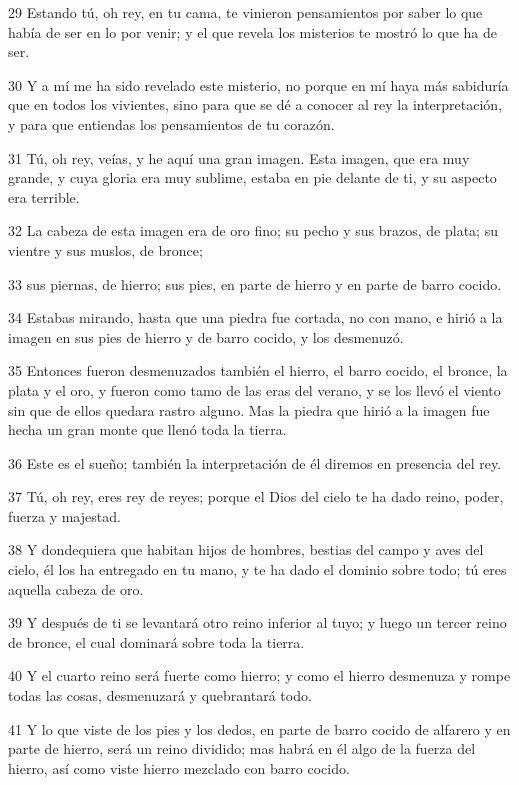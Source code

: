 \par 29 Estando tú, oh rey, en tu cama, te vinieron pensamientos por saber lo que había de ser en lo por venir; y el que revela los misterios te mostró lo que ha de ser.
\par 30 Y a mí me ha sido revelado este misterio, no porque en mí haya más sabiduría que en todos los vivientes, sino para que se dé a conocer al rey la interpretación, y para que entiendas los pensamientos de tu corazón.
\par 31 Tú, oh rey, veías, y he aquí una gran imagen. Esta imagen, que era muy grande, y cuya gloria era muy sublime, estaba en pie delante de ti, y su aspecto era terrible.
\par 32 La cabeza de esta imagen era de oro fino; su pecho y sus brazos, de plata; su vientre y sus muslos, de bronce;
\par 33 sus piernas, de hierro; sus pies, en parte de hierro y en parte de barro cocido.
\par 34 Estabas mirando, hasta que una piedra fue cortada, no con mano, e hirió a la imagen en sus pies de hierro y de barro cocido, y los desmenuzó.
\par 35 Entonces fueron desmenuzados también el hierro, el barro cocido, el bronce, la plata y el oro, y fueron como tamo de las eras del verano, y se los llevó el viento sin que de ellos quedara rastro alguno. Mas la piedra que hirió a la imagen fue hecha un gran monte que llenó toda la tierra.
\par 36 Este es el sueño; también la interpretación de él diremos en presencia del rey.
\par 37 Tú, oh rey, eres rey de reyes; porque el Dios del cielo te ha dado reino, poder, fuerza y majestad.
\par 38 Y dondequiera que habitan hijos de hombres, bestias del campo y aves del cielo, él los ha entregado en tu mano, y te ha dado el dominio sobre todo; tú eres aquella cabeza de oro.
\par 39 Y después de ti se levantará otro reino inferior al tuyo; y luego un tercer reino de bronce, el cual dominará sobre toda la tierra.
\par 40 Y el cuarto reino será fuerte como hierro; y como el hierro desmenuza y rompe todas las cosas, desmenuzará y quebrantará todo.
\par 41 Y lo que viste de los pies y los dedos, en parte de barro cocido de alfarero y en parte de hierro, será un reino dividido; mas habrá en él algo de la fuerza del hierro, así como viste hierro mezclado con barro cocido.
